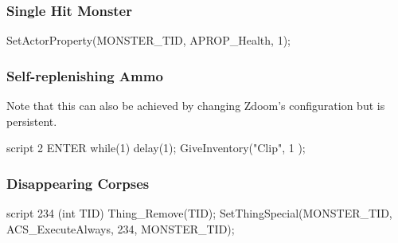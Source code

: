 		\subsubsection*{Single Hit Monster}
			\begin{clinee}
SetActorProperty(MONSTER_TID, APROP_Health, 1);
			\end{clinee}
		\subsubsection*{Self-replenishing Ammo}
		Note that this can also be achieved by changing Zdoom's configuration but is persistent.
			\begin{clinee}
script 2 ENTER
{   
    while(1)
    {
        delay(1);
        GiveInventory("Clip", 1 );
    }
}
			\end{clinee}
		\subsubsection*{Disappearing Corpses}
			\begin{clinee}
script 234 (int TID)
{
	Thing_Remove(TID);
}
SetThingSpecial(MONSTER_TID, ACS_ExecuteAlways, 234, MONSTER_TID);
			\end{clinee}
